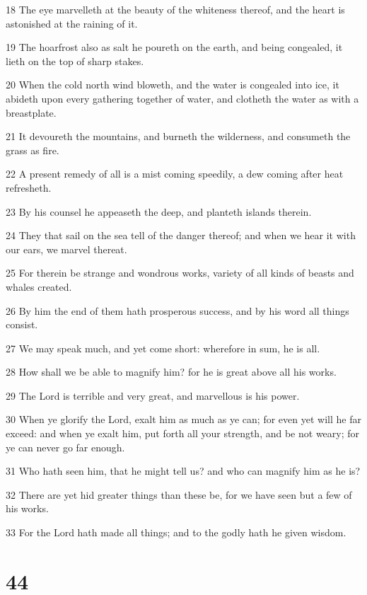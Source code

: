 \par 18 The eye marvelleth at the beauty of the whiteness thereof, and the heart is astonished at the raining of it.
\par 19 The hoarfrost also as salt he poureth on the earth, and being congealed, it lieth on the top of sharp stakes.
\par 20 When the cold north wind bloweth, and the water is congealed into ice, it abideth upon every gathering together of water, and clotheth the water as with a breastplate.
\par 21 It devoureth the mountains, and burneth the wilderness, and consumeth the grass as fire.
\par 22 A present remedy of all is a mist coming speedily, a dew coming after heat refresheth.
\par 23 By his counsel he appeaseth the deep, and planteth islands therein.
\par 24 They that sail on the sea tell of the danger thereof; and when we hear it with our ears, we marvel thereat.
\par 25 For therein be strange and wondrous works, variety of all kinds of beasts and whales created.
\par 26 By him the end of them hath prosperous success, and by his word all things consist.
\par 27 We may speak much, and yet come short: wherefore in sum, he is all.
\par 28 How shall we be able to magnify him? for he is great above all his works.
\par 29 The Lord is terrible and very great, and marvellous is his power.
\par 30 When ye glorify the Lord, exalt him as much as ye can; for even yet will he far exceed: and when ye exalt him, put forth all your strength, and be not weary; for ye can never go far enough.
\par 31 Who hath seen him, that he might tell us? and who can magnify him as he is?
\par 32 There are yet hid greater things than these be, for we have seen but a few of his works.
\par 33 For the Lord hath made all things; and to the godly hath he given wisdom.

\chapter{44}

